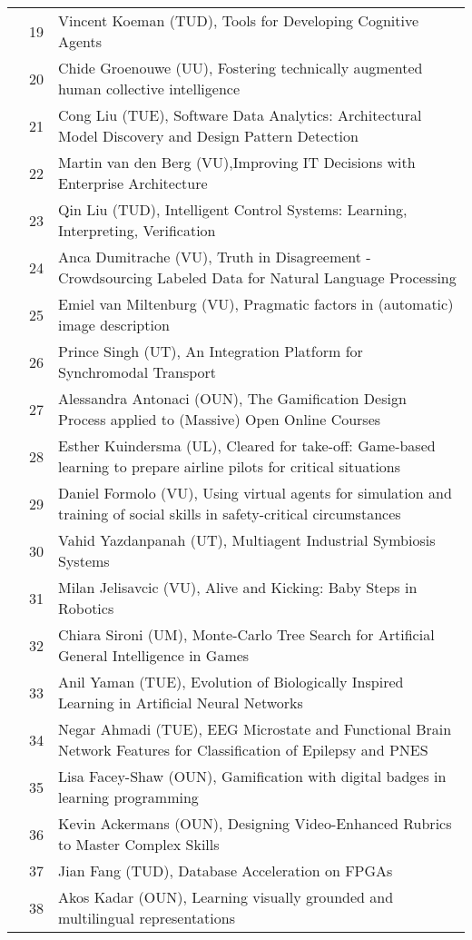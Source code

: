 {\begin{xltabular}{\linewidth}{@{} l @{\hspace{0.5em}} l @{\hspace{1em}} X @{}}
        &	 19	&	 Vincent Koeman (TUD), Tools for Developing Cognitive Agents \\
        &	 20	&	 Chide Groenouwe (UU), Fostering technically augmented human collective intelligence \\
        &	 21	&	 Cong Liu (TUE), Software Data Analytics: Architectural Model Discovery and Design Pattern Detection \\
        &	 22	&	 Martin van den Berg (VU),Improving IT Decisions with Enterprise Architecture \\
        &	 23	&	 Qin Liu (TUD), Intelligent Control Systems: Learning, Interpreting, Verification\\
        &	 24	&	 Anca Dumitrache (VU),  Truth in Disagreement - Crowdsourcing Labeled Data for Natural Language Processing\\
        &	 25	&	 Emiel van Miltenburg (VU), Pragmatic factors in (automatic) image description \\
        &	 26	&	 Prince Singh (UT), An Integration Platform for Synchromodal Transport \\
        &	 27	&	 Alessandra Antonaci (OUN), The Gamification Design Process applied to (Massive) Open Online Courses\\
        &	 28	&	 Esther Kuindersma (UL), Cleared for take-off: Game-based learning to prepare airline pilots for critical situations \\
        &	 29	&	 Daniel Formolo (VU), Using virtual agents for simulation and training of social skills in safety-critical circumstances \\
        &	 30	&	 Vahid Yazdanpanah (UT), Multiagent Industrial Symbiosis Systems \\
        &	 31	&	 Milan Jelisavcic (VU), Alive and Kicking: Baby Steps in Robotics \\
        &	 32	&	 Chiara Sironi (UM), Monte-Carlo Tree Search for Artificial General Intelligence in Games \\
        &	 33	&	 Anil Yaman (TUE), Evolution of Biologically Inspired Learning in Artificial Neural Networks \\
        &	 34	&	 Negar Ahmadi (TUE), EEG Microstate and Functional Brain Network Features for Classification of Epilepsy and PNES \\
        &	 35	&	 Lisa Facey-Shaw (OUN), Gamification with digital badges in learning programming \\
        &	 36	&	 Kevin Ackermans (OUN), Designing Video-Enhanced Rubrics to Master Complex Skills \\
        &	 37	&	 Jian Fang (TUD), Database Acceleration on FPGAs \\
        &	 38	&	 Akos Kadar (OUN), Learning visually grounded and multilingual representations \\



\end{xltabular}}
